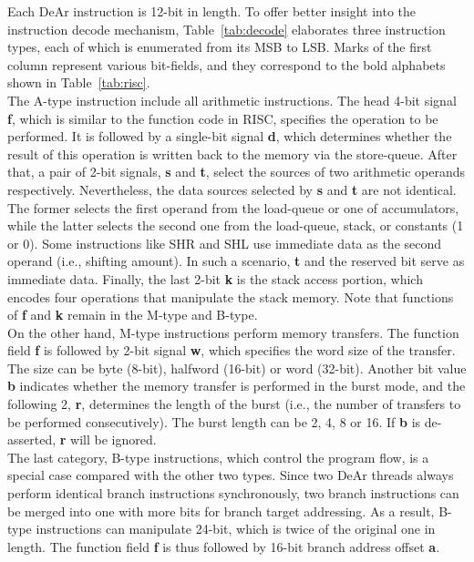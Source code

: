 Each DeAr instruction is 12-bit in length.
To offer better insight into the instruction decode mechanism, 
Table~\ref{tab:decode} elaborates three instruction types, 
each of which is enumerated from its MSB to LSB.
Marks of the first column represent various bit-fields, 
and they correspond to the bold alphabets shown in Table~\ref{tab:risc}.
\\\indent
The A-type instruction include all arithmetic instructions.
The head 4-bit signal \textbf{f}, which is similar to the function code in RISC, specifies the operation to be performed.
It is followed by a single-bit signal \textbf{d}, which determines whether the result of this operation is written back to the memory via the store-queue.
After that, a pair of 2-bit signals, \textbf{s} and \textbf{t}, select the sources of two arithmetic operands respectively. 
Nevertheless, the data sources selected by \textbf{s} and \textbf{t} are not identical.
The former selects the first operand from the load-queue or one of accumulators, 
while the latter selects the second one from the load-queue, stack, or constants (1 or 0).
Some instructions like SHR and SHL use immediate data as the second operand (i.e., shifting amount).
In such a scenario, \textbf{t} and the reserved bit serve as immediate data.
Finally, the last 2-bit \textbf{k} is the stack access portion, which encodes four operations that manipulate the stack memory.
Note that functions of \textbf{f} and \textbf{k} remain in the M-type and B-type.
\\\indent On the other hand, M-type instructions perform memory transfers.
The function field \textbf{f} is followed by 2-bit signal \textbf{w}, 
which specifies the word size of the transfer.
The size can be byte (8-bit), halfword (16-bit) or word (32-bit).
Another bit value \textbf{b} indicates whether the memory transfer is performed in the burst mode, 
and the following 2, \textbf{r}, determines the length of the burst (i.e., the number of transfers to be performed consecutively).
The burst length can be 2, 4, 8 or 16.
If \textbf{b} is de-asserted, \textbf{r} will be ignored.
\\\indent The last category, B-type instructions, which control the program flow, 
is a special case compared with the other two types.
Since two DeAr threads always perform identical branch instructions synchronously, 
two branch instructions can be merged into one with more bits for branch target addressing.
As a result, B-type instructions can manipulate 24-bit, which is twice of the original one in length.
The function field \textbf{f} is thus followed by 16-bit branch address offset \textbf{a}.

